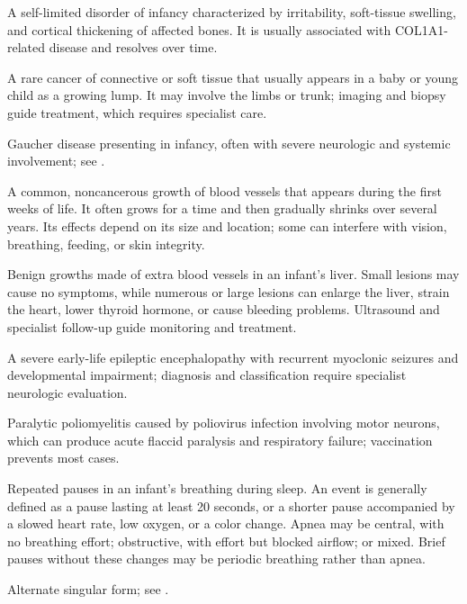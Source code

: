  A self-limited disorder of infancy characterized by irritability, soft-tissue swelling, and cortical thickening of affected bones. It is usually associated with COL1A1-related disease and resolves over time.

 A rare cancer of connective or soft tissue that usually appears in a baby or young child as a growing lump. It may involve the limbs or trunk; imaging and biopsy guide treatment, which requires specialist care.

 Gaucher disease presenting in infancy, often with severe neurologic and systemic involvement; see .

 A common, noncancerous growth of blood vessels that appears during the first weeks of life. It often grows for a time and then gradually shrinks over several years. Its effects depend on its size and location; some can interfere with vision, breathing, feeding, or skin integrity.

 Benign growths made of extra blood vessels in an infant’s liver. Small lesions may cause no symptoms, while numerous or large lesions can enlarge the liver, strain the heart, lower thyroid hormone, or cause bleeding problems. Ultrasound and specialist follow-up guide monitoring and treatment.

 A severe early-life epileptic encephalopathy with recurrent myoclonic seizures and developmental impairment; diagnosis and classification require specialist neurologic evaluation.

 Paralytic poliomyelitis caused by poliovirus infection involving motor neurons, which can produce acute flaccid paralysis and respiratory failure; vaccination prevents most cases.

 Repeated pauses in an infant's breathing during sleep. An event is generally defined as a pause lasting at least 20 seconds, or a shorter pause accompanied by a slowed heart rate, low oxygen, or a color change. Apnea may be central, with no breathing effort; obstructive, with effort but blocked airflow; or mixed. Brief pauses without these changes may be periodic breathing rather than apnea.

 Alternate singular form; see .

